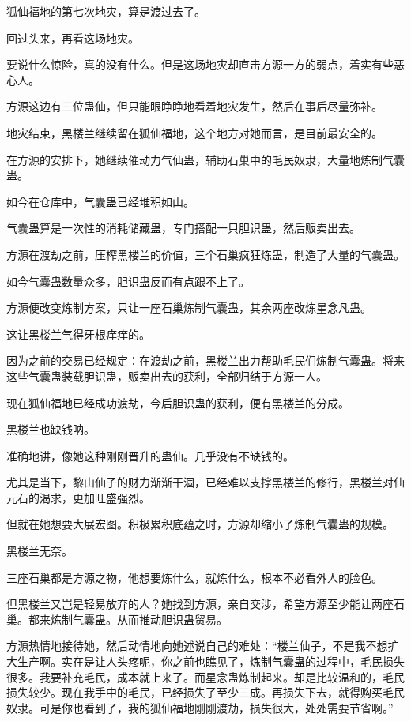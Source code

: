 
\begin{this_body}



狐仙福地的第七次地灾，算是渡过去了。

回过头来，再看这场地灾。

要说什么惊险，真的没有什么。但是这场地灾却直击方源一方的弱点，着实有些恶心人。

方源这边有三位蛊仙，但只能眼睁睁地看着地灾发生，然后在事后尽量弥补。

地灾结束，黑楼兰继续留在狐仙福地，这个地方对她而言，是目前最安全的。

在方源的安排下，她继续催动力气仙蛊，辅助石巢中的毛民奴隶，大量地炼制气囊蛊。

如今在仓库中，气囊蛊已经堆积如山。

气囊蛊算是一次性的消耗储藏蛊，专门搭配一只胆识蛊，然后贩卖出去。

方源在渡劫之前，压榨黑楼兰的价值，三个石巢疯狂炼蛊，制造了大量的气囊蛊。

如今气囊蛊数量众多，胆识蛊反而有点跟不上了。

方源便改变炼制方案，只让一座石巢炼制气囊蛊，其余两座改炼星念凡蛊。

这让黑楼兰气得牙根痒痒的。

因为之前的交易已经规定：在渡劫之前，黑楼兰出力帮助毛民们炼制气囊蛊。将来这些气囊蛊装载胆识蛊，贩卖出去的获利，全部归结于方源一人。

现在狐仙福地已经成功渡劫，今后胆识蛊的获利，便有黑楼兰的分成。

黑楼兰也缺钱呐。

准确地讲，像她这种刚刚晋升的蛊仙。几乎没有不缺钱的。

尤其是当下，黎山仙子的财力渐渐干涸，已经难以支撑黑楼兰的修行，黑楼兰对仙元石的渴求，更加旺盛强烈。

但就在她想要大展宏图。积极累积底蕴之时，方源却缩小了炼制气囊蛊的规模。

黑楼兰无奈。

三座石巢都是方源之物，他想要炼什么，就炼什么，根本不必看外人的脸色。

但黑楼兰又岂是轻易放弃的人？她找到方源，亲自交涉，希望方源至少能让两座石巢。都来炼制气囊蛊。从而推动胆识蛊贸易。

方源热情地接待她，然后动情地向她述说自己的难处：“楼兰仙子，不是我不想扩大生产啊。实在是让人头疼呢，你之前也瞧见了，炼制气囊蛊的过程中，毛民损失很多。我要补充毛民，成本就上来了。而星念蛊炼制起来。却是比较温和的，毛民损失较少。现在我手中的毛民，已经损失了至少三成。再损失下去，就得购买毛民奴隶。可是你也看到了，我的狐仙福地刚刚渡劫，损失很大，处处需要节省啊。”


\end{this_body}
